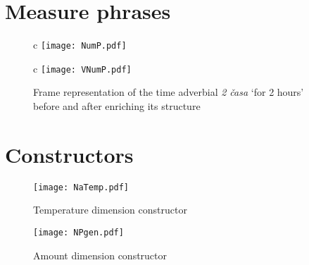 \section{Measure phrases}\label{app:measure}
\begin{figure}[H]
\begin{tabular}[t]{c}
\texttt{[image: NumP.pdf]}\\
\end{tabular}
\hfill
\begin{tabular}[t]{c}
\texttt{[image: VNumP.pdf]}\\
\end{tabular}
\caption{Frame representation of the time adverbial \textit{2 \v{c}asa} `for 2 hours' before and after enriching its structure \label{app:2hours}}
\end{figure}

\section{Constructors}\label{app:constructors}

\begin{figure}[H]
\begin{minipage}{0.6\textwidth}
\end{minipage}
\begin{minipage}{0.35\textwidth}
\texttt{[image: NaTemp.pdf]}
\end{minipage}
\caption{Temperature dimension constructor\label{app:temp}}
\end{figure}

\begin{figure}[H]
\begin{minipage}{0.5\textwidth}
\end{minipage}
\begin{minipage}{0.4\textwidth}
\texttt{[image: NPgen.pdf]}
\end{minipage}
\caption{Amount dimension constructor \label{app:amount}}
\end{figure}

